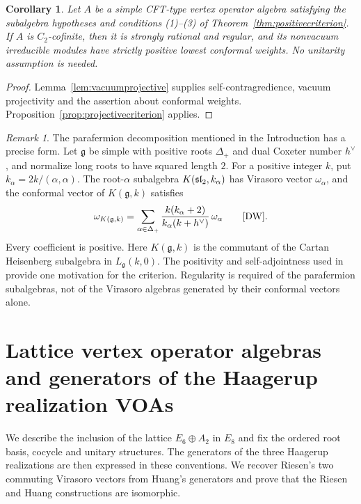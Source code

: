 \documentclass[11pt,reqno]{amsart}
\newtheorem{corollary}[theorem]{Corollary}
\theoremstyle{definition}\newtheorem{definition}[theorem]{Definition}
\theoremstyle{remark}\newtheorem{remark}[theorem]{Remark}
\numberwithin{equation}{section}
\begin{document}
\begin{corollary}\label{cor:nonunitarycriterion}
Let $A$ be a simple CFT-type vertex operator algebra satisfying the subalgebra hypotheses and conditions (1)--(3) of Theorem~\ref{thm:positivecriterion}. If $A$ is $C_2$-cofinite, then it is strongly rational and regular, and its nonvacuum irreducible modules have strictly positive lowest conformal weights. No unitarity assumption is needed.
\end{corollary}
\begin{proof}
Lemma~\ref{lem:vacuumprojective} supplies self-contragredience, vacuum projectivity and the assertion about conformal weights. Proposition~\ref{prop:projectivecriterion} applies.
\end{proof}

\begin{remark}\label{rem:paramotivation}
The parafermion decomposition mentioned in the Introduction has a precise form. Let $\mathfrak g$ be simple with positive roots $\Delta_+$ and dual Coxeter number $h^\vee$, and normalize long roots to have squared length $2$. For a positive integer $k$, put $k_\alpha=2k/(\alpha,\alpha)$. The root-$\alpha$ subalgebra $K(\mathfrak{sl}_2,k_\alpha)$ has Virasoro vector $\omega_\alpha$, and the conformal vector of $K(\mathfrak g,k)$ satisfies
\[
 \omega_{K(\mathfrak g,k)}
 =\sum_{\alpha\in\Delta_+}
   \frac{k(k_\alpha+2)}{k_\alpha(k+h^\vee)}\,\omega_\alpha
 \qquad\text{\cite[Section 2]{DW}}.
\]
Every coefficient is positive. Here $K(\mathfrak g,k)$ is the commutant of the Cartan Heisenberg subalgebra in $L_{\mathfrak g}(k,0)$. The positivity and self-adjointness used in \cite[Section 3]{DW} provide one motivation for the criterion. Regularity is required of the parafermion subalgebras, not of the Virasoro algebras generated by their conformal vectors alone.
\end{remark}


\section{Lattice vertex operator algebras and generators of the Haagerup realization VOAs}\label{sec:lattice}
We describe the inclusion of the lattice $E_6\oplus A_2$ in $E_8$ and fix the ordered root basis, cocycle and unitary structures. The generators of the three Haagerup realizations are then expressed in these conventions. We recover Riesen's two commuting Virasoro vectors from Huang's generators and prove that the Riesen and Huang constructions are isomorphic.
\end{document}
